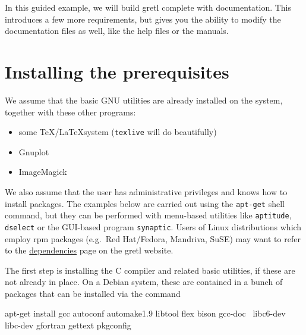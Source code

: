 In this guided example, we will build gretl complete with
documentation.  This introduces a few more requirements, but gives you
the ability to modify the documentation files as well, like the help
files or the manuals.

\section{Installing the prerequisites}

We assume that the basic GNU utilities are already installed on the
system, together with these other programs:
\begin{itemize}
\item some \TeX/\LaTeX system (\texttt{texlive} will do beautifully)
\item Gnuplot
\item ImageMagick
\end{itemize}
We also assume that the user has administrative privileges and knows
how to install packages.  The examples below are carried out using the
\texttt{apt-get} shell command, but they can be performed with
menu-based utilities like \texttt{aptitude}, \texttt{dselect} or the
GUI-based program \texttt{synaptic}. Users of Linux distributions
which employ rpm packages (e.g.\ Red Hat/Fedora, Mandriva, SuSE) may
want to refer to the
\href{http://gretl.sourceforge.net/depend.html}{dependencies} page on
the gretl website.

The first step is installing the C compiler and related basic
utilities, if these are not already in place. On a Debian system,
these are contained in a bunch of packages that can be installed via
the command
\begin{code}
apt-get install gcc autoconf automake1.9 libtool flex bison gcc-doc \
libc6-dev libc-dev gfortran gettext pkgconfig
\end{code}

